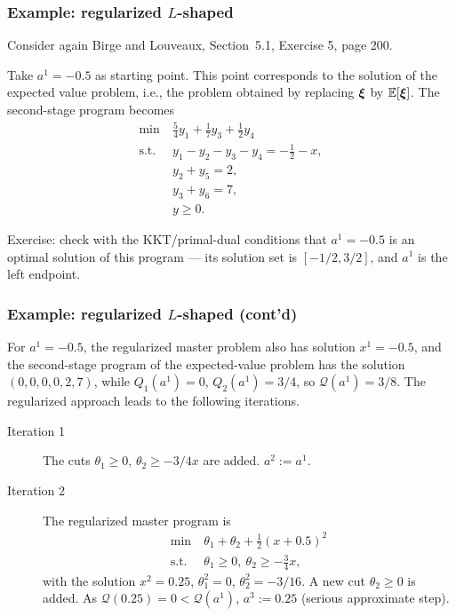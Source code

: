 \documentclass[aspectratio=169]{beamer}
\begin{document}
\begin{frame}
\frametitle{Example: regularized $L$-shaped}

Consider again {\red Birge and Louveaux, Section~5.1, Exercise 5, page 200}.

Take $a^1 = -0.5$ as starting point.
This point corresponds to the solution of the expected value problem, i.e., the problem obtained by replacing ${\boldsymbol{\xi}}$ by ${\mathbb{E}}[{\boldsymbol{\xi}}]$.
The second-stage program becomes
\begin{align*}
\min\ & \frac{5}{4}y_1 + \frac{1}{7}y_3 + \frac{1}{2}y_4\\
\text{s.t. } & y_1 - y_2 - y_3 - y_4 = -\frac{1}{2}-x, \\
& y_2+y_5 = 2, \\
& y_3+y_6 = 7, \\
& y \geq 0.
\end{align*}

{\blue Exercise}: check with the KKT/primal-dual conditions that $a^1 = -0.5$ is an optimal {\red solution} of this program --- its solution set is $[-1/2, 3/2]$, and $a^1$ is the left endpoint.
\end{frame}

\begin{frame}
\frametitle{Example: regularized $L$-shaped (cont'd)}

For $a^1 = -0.5$, the regularized master problem also has solution $x^1 = -0.5$, and the second-stage program of the expected-value problem has the solution $(0,0,0,0,2,7)$, while $Q_1(a^1) = 0$, $Q_2(a^1) = 3/4$, so $\mathcal{Q}(a^1) = 3/8$.
The regularized approach leads to the following iterations.
\begin{description}
\item[Iteration 1] The cuts $\theta_1 \geq 0$, $\theta_2 \geq -3/4
x$ are added. $a^2:= a^1$.
\item[Iteration 2]
The regularized master program is
\begin{align*}
\min\ & \theta_1 + \theta_2 + \frac{1}{2}(x+0.5)^2 \\
\text{s.t. } & \theta_1 \geq 0,\ \theta_2 \geq -\frac{3}{4}x,
\end{align*}
with the solution $x^2 = 0.25$, $\theta_1^2 = 0$, $\theta_2^2 = -3/16$.
A new cut $\theta_2 \geq 0$ is added.
As $\mathcal{Q}(0.25) = 0 < \mathcal{Q}(a^1)$, $a^3 := 0.25$ (serious approximate step).
\end{description}
\end{frame}
\end{document}
